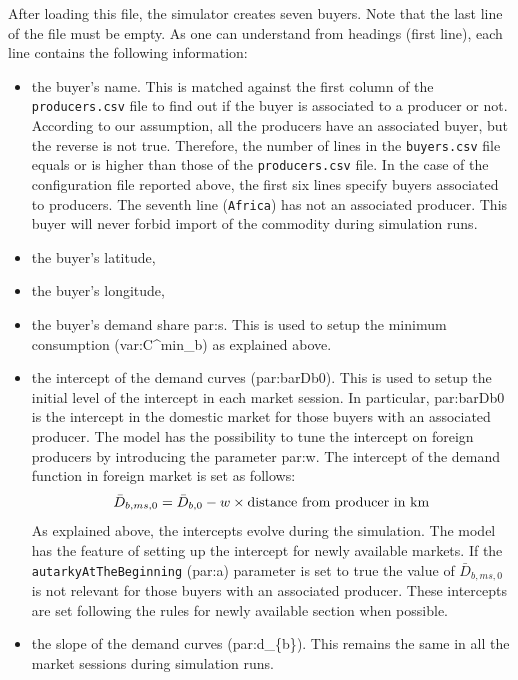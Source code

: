 \documentclass{article}
\begin{document}
After loading this file, the simulator creates seven buyers. Note that the last line of the file must be empty.
As one can understand from headings (first line), each line contains the following information:
\begin{itemize}
	\item the buyer's name. This is matched against the first column of the \verb+producers.csv+ file to find out if the buyer is associated to a producer or not. 
		According to our assumption, all the producers have an associated buyer, but the reverse is not true. Therefore, the number of lines in the \verb+buyers.csv+ file equals or is higher than those of the \verb+producers.csv+ file.  In the case of the configuration file reported above, the first six lines specify buyers associated to producers. The seventh line (\verb+Africa+) has not an associated producer. This buyer will never forbid import of the commodity during simulation runs.
	\item the buyer's latitude,
	\item the buyer's longitude,
	\item the buyer's demand share \gls{par:s}. This is used to setup the minimum consumption (\gls{var:C^min_b}) as explained above.
	\item the intercept of the demand curves (\gls{par:barDb0}). This is used to setup the initial level of the intercept in each market session. 
		In particular, \gls{par:barDb0} is the intercept in the domestic market for those buyers with an associated producer. The model has the possibility to tune the intercept on foreign producers by introducing the parameter \gls{par:w}. The intercept of the demand function in foreign market is set as follows:
		\[
			\bar{D}_{b,ms,0}=\bar{D}_{b,0}-w \times \textnormal{distance from producer in km}
		\]
		As explained above, the intercepts evolve during the simulation. The model has the feature of setting up the intercept for newly available markets. If the \verb+autarkyAtTheBeginning+ (\gls{par:a}) parameter is set to true the value of $\bar{D}_{b,ms,0}$ is not relevant for those buyers with an associated producer. These intercepts are set following the rules for newly available section when possible.
	\item the slope of the demand curves (\gls{par:d_{b}}). This remains the same in all the market sessions during simulation runs.
\end{itemize}
\end{document}
